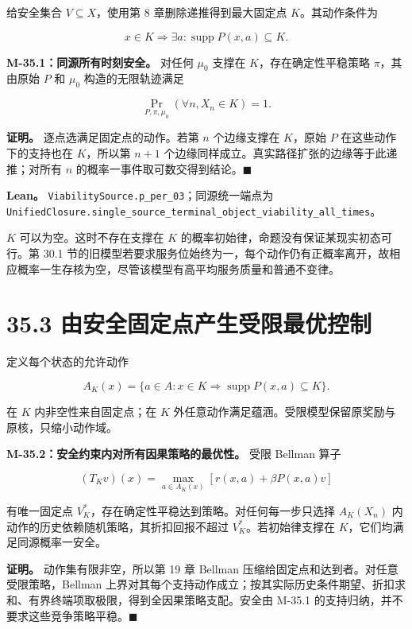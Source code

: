 \documentclass[
  11pt,
  oneside]{book}
\begin{document}
给安全集合 \(V\subseteq X\)，使用第 8 章删除递推得到最大固定点 \(K\)。其动作条件为

\[x\in K\Longrightarrow\exists a:\operatorname{supp}P(x,a)\subseteq K.\]

\hypertarget{m-35-1}{}\label{m-35-1}

\textbf{M-35.1：同源所有时刻安全。} 对任何 \(\mu_0\) 支撑在 \(K\)，存在确定性平稳策略 \(\pi\)，其由原始 \(P\) 和 \(\mu_0\) 构造的无限轨迹满足

\[\Pr_{P,\pi,\mu_0}(\forall n, X_n\in K)=1.\]

\textbf{证明。} 逐点选满足固定点的动作。若第 \(n\) 个边缘支撑在 \(K\)，原始 \(P\) 在这些动作下的支持也在 \(K\)，所以第 \(n+1\) 个边缘同样成立。真实路径扩张的边缘等于此递推；对所有 \(n\) 的概率一事件取可数交得到结论。\(\blacksquare\)

\textbf{Lean。} \nolinkurl{ViabilitySource.p_per_03}；同源统一端点为 \nolinkurl{UnifiedClosure.single_source_terminal_object_viability_all_times}。

\(K\) 可以为空。这时不存在支撑在 \(K\) 的概率初始律，命题没有保证某现实初态可行。第 30.1 节的旧模型若要求服务位始终为一，每个动作仍有正概率离开，故相应概率一生存核为空，尽管该模型有高平均服务质量和普通不变律。

\section{35.3 由安全固定点产生受限最优控制}\label{ux7531ux5b89ux5168ux56faux5b9aux70b9ux4ea7ux751fux53d7ux9650ux6700ux4f18ux63a7ux5236}

定义每个状态的允许动作

\[A_K(x)=\{a\in A: x\in K\Rightarrow\operatorname{supp}P(x,a)\subseteq K\}.\]

在 \(K\) 内非空性来自固定点；在 \(K\) 外任意动作满足蕴涵。受限模型保留原奖励与原核，只缩小动作域。

\hypertarget{m-35-2}{}\label{m-35-2}

\textbf{M-35.2：安全约束内对所有因果策略的最优性。} 受限 Bellman 算子

\[(T_Kv)(x)=\max_{a\in A_K(x)}[r(x,a)+\beta P(x,a)v]\]

有唯一固定点 \(V_K^*\)，存在确定性平稳达到策略。对任何每一步只选择 \(A_K(X_n)\) 内动作的历史依赖随机策略，其折扣回报不超过 \(V_K^*\)。若初始律支撑在 \(K\)，它们均满足同源概率一安全。

\textbf{证明。} 动作集有限非空，所以第 19 章 Bellman 压缩给固定点和达到者。对任意受限策略，Bellman 上界对其每个支持动作成立；按其实际历史条件期望、折扣求和、有界终端项取极限，得到全因果策略支配。安全由 M-35.1 的支持归纳，并不要求这些竞争策略平稳。\(\blacksquare\)
\end{document}
